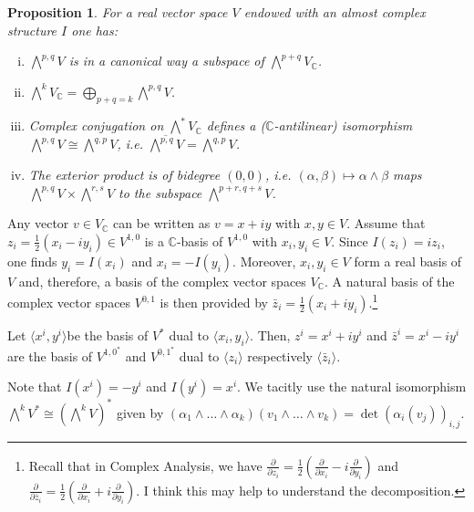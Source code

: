 \documentclass{article}
\theoremstyle{definition}
\theoremstyle{plain}
\newtheorem{proposition}[definition]{Proposition}
\begin{document}
\begin{proposition}
    For a real vector space $ V $ endowed with an almost complex structure $ I $ one has:\begin{enumerate}[(i)]
        \item $ \bigwedge^{p,q}V $ is in a canonical way a subspace of $ \bigwedge^{p+q}V_{\mathbb{C}} $.
        \item $ \bigwedge^{k}V_{\mathbb{C}}=\bigoplus\limits_{p+q=k}\bigwedge^{p,q}V $.
        \item Complex conjugation on $ \bigwedge^{*}V_{\mathbb{C}} $ defines a ($ \mathbb{C} $-antilinear) isomorphism $ \bigwedge^{p,q}V\cong\bigwedge^{q,p}V $, i.e. $ \overline{\bigwedge^{p,q}V}=\bigwedge^{q,p}V $.
        \item The exterior product is of bidegree $ (0,0) $, i.e. $ (\alpha,\beta)\mapsto\alpha\wedge\beta $ maps $ \bigwedge^{p,q}V\times \bigwedge^{r,s}V $ to the subspace $ \bigwedge^{p+r,q+s}V $.
    \end{enumerate}
\end{proposition}

Any vector $ v\in V_{\mathbb{C}} $ can be written as $ v=x+iy $ with $ x,y\in V $. Assume that $ z_i=\frac{1}{2}(x_i-iy_i)\in V^{1,0} $ is a $ \mathbb{C} $-basis of $ V^{1,0} $ with $ x_i,y_i\in V $. Since $ I(z_i)=iz_i $, one finds $ y_i=I(x_i) $ and $ x_i=-I(y_i) $. Moreover, $ x_i,y_i\in V $ form a real basis of $ V $ and, therefore, a basis of the complex vector spaces $ V_{\mathbb{C}} $. A natural basis of the complex vector spaces $ V^{0,1} $ is then provided by $ \bar{z}_i=\frac{1}{2}(x_i+iy_i) $.\footnote{Recall that in Complex Analysis, we have $ \frac{\partial}{\partial z_i}=\frac{1}{2}(\frac{\partial}{\partial x_i}-i\frac{\partial}{\partial y_i}) $ and $ \frac{\partial}{\partial \bar{z}_i}=\frac{1}{2}(\frac{\partial}{\partial x_i}+i\frac{\partial}{\partial y_i}) $. I think this may help to understand the decomposition.}

Let $ \langle x^i,y^i\rangle $be the basis of $ V^{*} $ dual to $ \langle x_i,y_i\rangle $. Then, $ z^i=x^i+iy^i $ and $ \bar{z}^i=x^i-iy^i $ are the basis of $ V^{1,0^*} $ and $ V^{0,1^*} $ dual to $ \langle z_i\rangle $ respectively $ \langle \bar{z}_i \rangle $.

Note that $ I(x^i)=-y^i $ and $ I(y^i)=x^i $. We tacitly use the natural isomorphism $ \bigwedge^{k}V^{*}\cong(\bigwedge^{k}V)^* $ given by $ (\alpha_1\wedge\dots\wedge\alpha_k)(v_1\wedge\dots\wedge v_k)=\det(\alpha_i(v_j))_{i,j} $.
\end{document}
